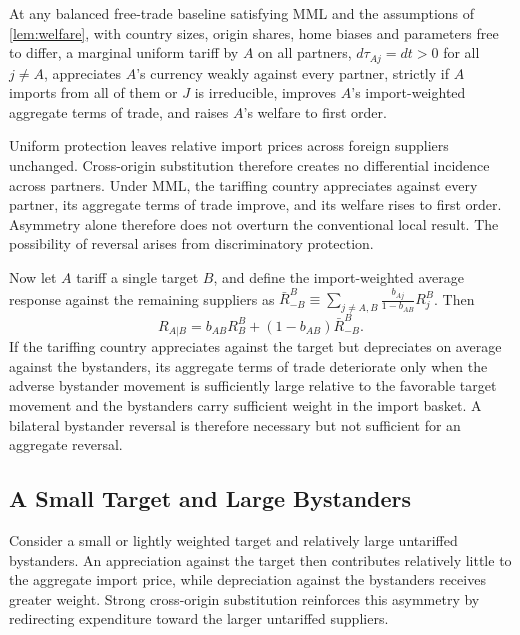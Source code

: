 \begin{proposition}
\label{prop:uniform}
At any balanced free-trade baseline satisfying MML and the assumptions of \cref{lem:welfare}, with country sizes, origin shares, home biases and parameters free to differ, a marginal uniform tariff by $A$ on all partners, $d\tau_{Aj}=dt>0$ for all $j\neq A$, appreciates $A$'s currency weakly against every partner, strictly if $A$ imports from all of them or $J$ is irreducible, improves $A$'s import-weighted aggregate terms of trade, and raises $A$'s welfare to first order.
\end{proposition}

Uniform protection leaves relative import prices across foreign suppliers unchanged. Cross-origin substitution therefore creates no differential incidence across partners. Under MML, the tariffing country appreciates against every partner, its aggregate terms of trade improve, and its welfare rises to first order. Asymmetry alone therefore does not overturn the conventional local result. The possibility of reversal arises from discriminatory protection.

Now let $A$ tariff a single target $B$, and define the import-weighted average response against the remaining suppliers as $\bar R^B_{-B}\equiv\sum_{j\neq A,B}\frac{b_{Aj}}{1-b_{AB}}R^B_j$. Then
\begin{equation}
R_{A|B}=b_{AB}R^B_B+(1-b_{AB})\bar R^B_{-B}.
\label{eq:totsplit}
\end{equation}
If the tariffing country appreciates against the target but depreciates on average against the bystanders, its aggregate terms of trade deteriorate only when the adverse bystander movement is sufficiently large relative to the favorable target movement and the bystanders carry sufficient weight in the import basket. A bilateral bystander reversal is therefore necessary but not sufficient for an aggregate reversal.

\subsection{A Small Target and Large Bystanders}

Consider a small or lightly weighted target and relatively large untariffed bystanders. An appreciation against the target then contributes relatively little to the aggregate import price, while depreciation against the bystanders receives greater weight. Strong cross-origin substitution reinforces this asymmetry by redirecting expenditure toward the larger untariffed suppliers.

